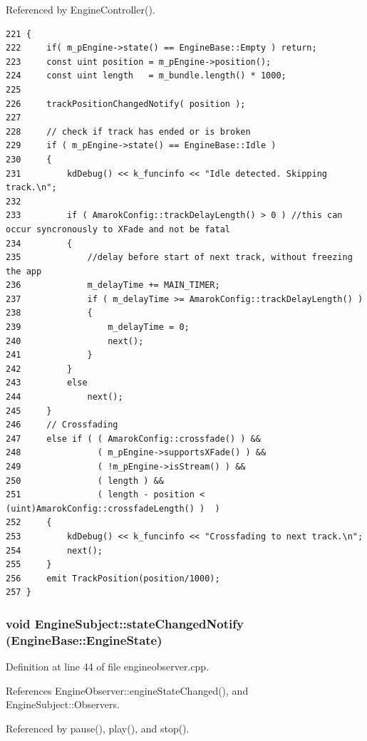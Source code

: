 Referenced by Engine\-Controller().



\footnotesize\begin{verbatim}221 {
222     if( m_pEngine->state() == EngineBase::Empty ) return;
223     const uint position = m_pEngine->position();
224     const uint length   = m_bundle.length() * 1000;
225 
226     trackPositionChangedNotify( position );
227 
228     // check if track has ended or is broken
229     if ( m_pEngine->state() == EngineBase::Idle )
230     {
231         kdDebug() << k_funcinfo << "Idle detected. Skipping track.\n";
232 
233         if ( AmarokConfig::trackDelayLength() > 0 ) //this can occur syncronously to XFade and not be fatal
234         {
235             //delay before start of next track, without freezing the app
236             m_delayTime += MAIN_TIMER;
237             if ( m_delayTime >= AmarokConfig::trackDelayLength() )
238             {
239                 m_delayTime = 0;
240                 next();
241             }
242         }
243         else
244             next();
245     }
246     // Crossfading
247     else if ( ( AmarokConfig::crossfade() ) &&
248               ( m_pEngine->supportsXFade() ) &&
249               ( !m_pEngine->isStream() ) &&
250               ( length ) &&
251               ( length - position < (uint)AmarokConfig::crossfadeLength() )  )
252     {
253         kdDebug() << k_funcinfo << "Crossfading to next track.\n";
254         next();
255     }
256     emit TrackPosition(position/1000);
257 }
\end{verbatim}\normalsize 
{}
\subsubsection{\setlength{\rightskip}{0pt plus 5cm}void Engine\-Subject::state\-Changed\-Notify ({\bf Engine\-Base::Engine\-State})\hspace{0.3cm}{\tt  [protected, inherited]}}\label{classEngineSubject_EngineSubjectb2}




Definition at line 44 of file engineobserver.cpp.

References Engine\-Observer::engine\-State\-Changed(), and Engine\-Subject::Observers.

Referenced by pause(), play(), and stop().




